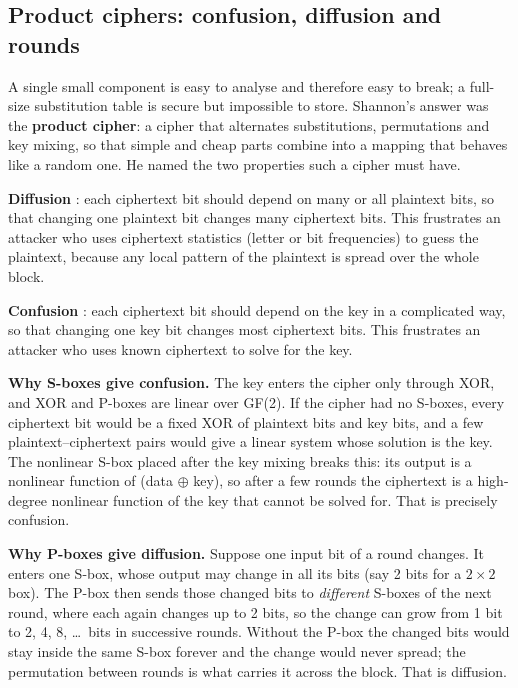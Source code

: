 \subsection{Product ciphers: confusion, diffusion and rounds \hot}
A single small component is easy to analyse and therefore easy to break; a full-size substitution table is secure but impossible to store. Shannon's answer was the \textbf{product cipher}: a cipher that alternates substitutions, permutations and key mixing, so that simple and cheap parts combine into a mapping that behaves like a random one. He named the two properties such a cipher must have.

\textbf{Diffusion} : each ciphertext bit should depend on many or all plaintext bits, so that changing one plaintext bit changes many ciphertext bits. This frustrates an attacker who uses ciphertext statistics (letter or bit frequencies) to guess the plaintext, because any local pattern of the plaintext is spread over the whole block.

\textbf{Confusion} : each ciphertext bit should depend on the key in a complicated way, so that changing one key bit changes most ciphertext bits. This frustrates an attacker who uses known ciphertext to solve for the key.

\textbf{Why S-boxes give confusion.} The key enters the cipher only through XOR, and XOR and P-boxes are linear over GF(2). If the cipher had no S-boxes, every ciphertext bit would be a fixed XOR of plaintext bits and key bits, and a few plaintext--ciphertext pairs would give a linear system whose solution is the key. The nonlinear S-box placed after the key mixing breaks this: its output is a nonlinear function of (data $\oplus$ key), so after a few rounds the ciphertext is a high-degree nonlinear function of the key that cannot be solved for. That is precisely confusion.

\textbf{Why P-boxes give diffusion.} Suppose one input bit of a round changes. It enters one S-box, whose output may change in all its bits (say 2 bits for a $2 \times 2$ box). The P-box then sends those changed bits to \emph{different} S-boxes of the next round, where each again changes up to 2 bits, so the change can grow from 1 bit to 2, 4, 8, \dots\ bits in successive rounds. Without the P-box the changed bits would stay inside the same S-box forever and the change would never spread; the permutation between rounds is what carries it across the block. That is diffusion.

